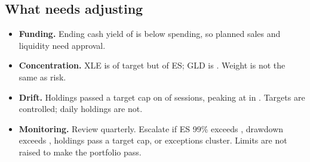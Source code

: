 \documentclass[11pt,a4paper]{article}
\begin{document}
\subsection{What needs adjusting}
\begin{itemize}[itemsep=1pt]
\item \textbf{Funding.} Ending cash yield of \qeIncomeYield{} is below \qeSpending{} spending, so planned sales and liquidity need approval.
\item \textbf{Concentration.} XLE is \qeWeightXle{} of target but \qeShareXle{} of ES; GLD is \qeShareGld{}. Weight is not the same as risk.
\item \textbf{Drift.} Holdings passed a target cap on \qeDriftSessions{} of \qeActiveSessions{} sessions, peaking at \qeDriftMax{} in \qeDriftTicker{}. Targets are controlled; daily holdings are not.
\item \textbf{Monitoring.} Review quarterly. Escalate if ES 99\% exceeds \qeBudgetEs{}, drawdown exceeds \qeBudgetDrawdown{}, holdings pass a target cap, or exceptions cluster. Limits are not raised to make the portfolio pass.
\end{itemize}

\end{document}
